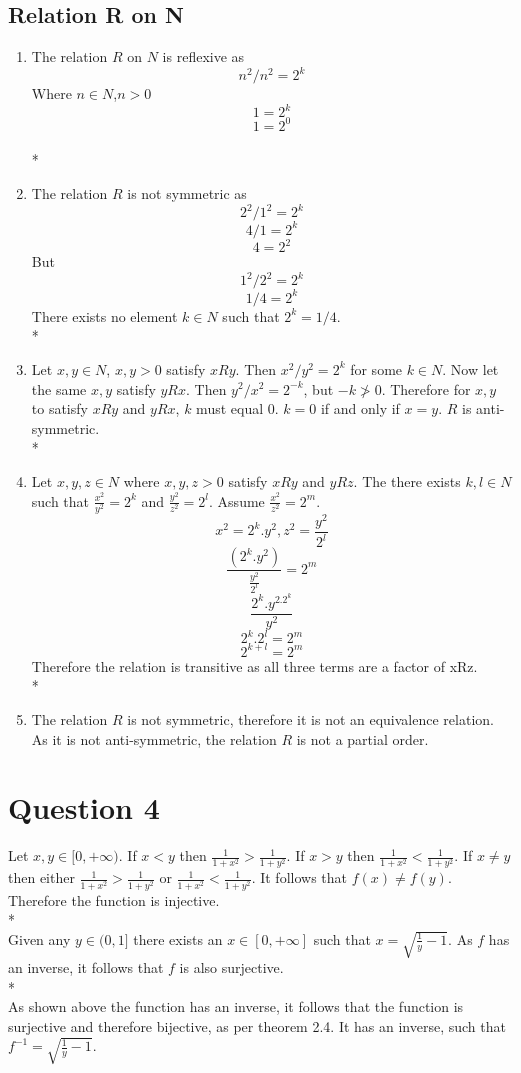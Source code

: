 \documentclass[a4paper,12pt]{article}
\begin{document}
\subsection{Relation R on N}
\begin{enumerate}
  \item
    The relation $R$ on $N$ is reflexive as \[n^2 / n^2 = 2^k\]
Where $n \in N$,$n > 0$
\[1 = 2^k\]
\[1 = 2^0\]
\\*
\\
\item
  The relation $R$ is not symmetric as \[ 2^2 / 1^2 = 2^k\]
\[4 / 1 = 2^k\]
\[ 4 = 2^2\]
But \[ 1^2 / 2^2 = 2^k\]
\[ 1 / 4 = 2^k\]
There exists no element $k \in N$ such that $2^k = 1/4$.
\\*
\\
\item
Let $x,y \in N$, $x,y > 0$ satisfy $xRy$. Then $x^2 / y^2 = 2^k$ for some $k \in N$.
Now let the same $x,y$ satisfy $yRx$. 
Then $y^2 / x^2 = 2^{-k}$, but $-k \not> 0$. 
Therefore for $x,y$ to satisfy $xRy$ and $yRx$, $k$ must equal $0$. $k = 0$ if and only if $x = y$. $R$ is anti-symmetric.
\\*
\\
\item
 Let $x,y,z \in N$ where $x,y,z > 0$ satisfy $xRy$ and $yRz$. 
 The there exists $k,l \in N$ such that $\frac{x^2}{y^2} = 2^k$ and $\frac{y^2}{z^2} = 2^l$. Assume $\frac{x^2}{z^2} = 2^m$.
  \[x^2 = 2^k.y^2 , z^2 = \frac{y^2}{2^l}\]
  \[\frac{(2^k.y^2)}{\frac{y^2}{2^l}} = 2^m\]
  \[\frac{2^k.y^2.2^k}{y^2}\]
  \[2^k.2^l = 2^m\]
  \[2^{k + l} = 2^m\]
  Therefore the relation is transitive as all three terms are a factor of xRz.
\\*
\\
\item 
  The relation $R$ is not symmetric, therefore it is not an equivalence relation.
As it is not anti-symmetric, the relation $R$ is not a partial order.
\end{enumerate}
\section{Question 4}
Let $x,y \in [0,+\infty)$. If $x < y$ then $\frac{1}{1 + x^2} > \frac{1}{1 + y^2}$. 
If $x > y$ then $\frac{1}{1 + x^2} < \frac{1}{1 + y^2}$. If $x \not= y$ then either 
$\frac{1}{1 + x^2} > \frac{1}{1 + y^2}$ or $\frac{1}{1 + x^2} < \frac{1}{1 + y^2}$. It follows that $f(x) \not= f(y)$.
Therefore the function is injective.
\\*
\\
Given any $y \in (0,1]$ there exists an $x \in [0,+\infty]$ such that $x = \sqrt{\frac{1}{y} -1}$.
As $f$ has an inverse, it follows that $f$ is also surjective.
\\*
\\
As shown above the function has an inverse, it follows that the function is surjective and therefore bijective, 
as per theorem 2.4.
It has an inverse, such that $f^{-1} =  \sqrt{\frac{1}{y} -1}$.
\end{document}
